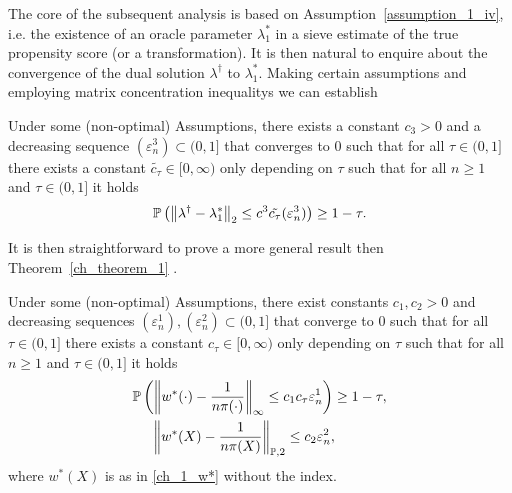 The core of the subsequent analysis is based on
Assumption~\ref{assumption_1_iv}, 
i.e.
the existence of an oracle parameter
$\lambda_1^{*}$
in a sieve estimate of the true propensity score (or a transformation). 
It is then natural to enquire about the convergence of the dual solution
$
  \lambda^\dagger
$
to 
$
  \lambda^*_1
$.
Making certain assumptions and employing
matrix concentration inequalitys \cite{Tropp2015}
we can establish
\begin{proposition}
  \label{ch_1_near_oracle}
  Under some (non-optimal) Assumptions,
  there exists a constant
  $
    c_{3}
    >
    0
  $
  and a decreasing sequence
  $
    (\varepsilon_n^3)
    \subset
    (0,1]
  $
  that converges to 0
  such that
  for all
  $
    \tau
    \in
    (0,1]
  $
  there exists a constant
  $
    \tilde{
    c_{\tau}
    }
    \in
    [0,\infty)
  $
  only depending on 
  $ \tau $
  such that for all 
  $ n \ge 1 $
  and
  $
    \tau
    \in
    (0,1]
  $
  it holds
  \begin{gather}
    \mathbb{P}
    \left( 
      \left\lVert
        \lambda^\dagger
        -
        \lambda^*_1
      \right\rVert_2
      \le
      c^3
      \tilde{
        c_{\tau}
      }
      (
        \varepsilon_n^3
      )
    \right)
    \ge 
    1 - \tau.
  \end{gather}
\end{proposition}%
It is then straightforward to prove a more general result
then
Theorem~\ref{ch_theorem_1}%
.
%
\begin{theorem}
  Under some (non-optimal) Assumptions,
  there exist constants
  $
    c_{1}
    , 
    c_{2}
    >
    0
  $
  and decreasing sequences
  $
    (\varepsilon_n^1)
    ,
    (\varepsilon_n^2)
    \subset
    (0,1]
  $
  that converge to 0
  such that
  for all
  $
    \tau
    \in
    (0,1]
  $
  there exists a constant
  $
    c_{\tau}
    \in
    [0,\infty)
  $
  only depending on 
  $ \tau $
  such that for all 
  $ n \ge 1 $
  and
  $
    \tau
    \in
    (0,1]
  $
  it holds
  \begin{align*}
   & \mathbb{P}
    \left( 
  \left\lVert
    w^*(\cdot)
    -
    \frac{1}{n \pi(\cdot)}
  \right\rVert_\infty
  \le 
  c_{1}
  c_{\tau}
  \varepsilon_{n}^1 
   \right)
   \ge
  1 - \tau
  ,
\\
   &\quad \
   \left\lVert
    w^*(X)
    -
    \frac{1}{n \pi(X)}
  \right\rVert_{\mathbb{P}, 2}
  \le 
  c_{2}
  \varepsilon_n^{2},
  \end{align*}
  where 
  $w^*(X)$
  is as in \eqref{ch_1_w*}
  without the index.
\end{theorem}


